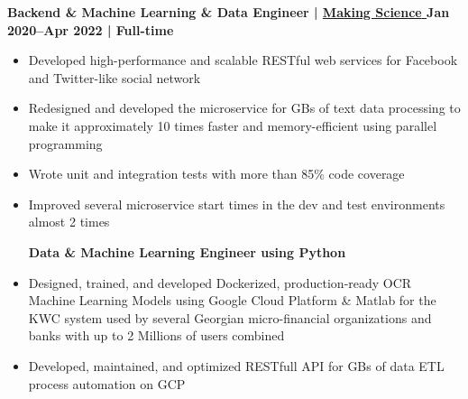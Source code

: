 \textbf{Backend \& Machine Learning \& Data Engineer | 
\href{https://www.makingscience.com/}{
    {Making Science} 
} \hfill Jan 2020--Apr 2022 | Full-time}

\par
\begin{itemize}[label=$\bullet$] 
    \centerline {\textbf{Go Engineer}}
    \item Developed high-performance and scalable RESTful web services for Facebook and Twitter-like social network
    \item Redesigned and developed the microservice for GBs of text data processing to make it approximately 10 times faster and memory-efficient using parallel programming
    \item Wrote unit and integration tests with more than 85\% code coverage
    \item Improved several microservice start times in the dev and test environments almost 2 times \newline

    \centerline {\textbf{Data \& Machine Learning Engineer using Python}}
    \item Designed, trained, and developed Dockerized, production-ready OCR Machine Learning Models using Google Cloud Platform \& Matlab for the KWC system used by several Georgian micro-financial organizations and banks with up to 2 Millions of users combined
    \item Developed, maintained, and optimized RESTfull API for GBs of data ETL process automation on GCP
\end{itemize}\par
